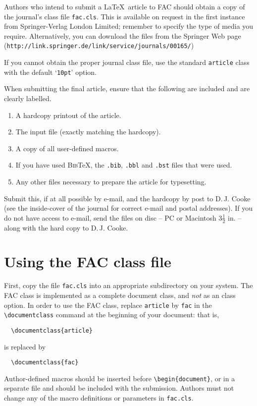 \documentclass{fac}
\begin{document}
Authors who intend to submit a \LaTeX\ article to FAC should obtain a
copy of the journal's class file \verb"fac.cls". This is available on
request in the first instance from Springer-Verlag London Limited; remember to
specify the type of media you require. Alternatively, you can download
the files from the Springer Web page
(\verb"http://link.springer.de/link/service/journals/00165/")

If you cannot obtain the proper journal class file, use the standard
\verb"article" class with the default `\verb"10pt"' option.

When submitting the final article, ensure that  the following are included and
are clearly labelled.
\begin{enumerate}
  \item A hardcopy printout of the article.
  \item The input file (exactly matching the hardcopy).
  \item A copy of all user-defined macros.
  \item If you have used \textsc{Bib}\TeX, the \verb".bib", \verb".bbl"
        and \verb".bst" files that were used.
  \item Any other files necessary to prepare the article for typesetting.
\end{enumerate}
Submit this, if at all possible by e-mail, and the hardcopy by post
to D.\,J. Cooke (see the inside-cover of the journal for correct e-mail
and postal addresses). If you do not have access to e-mail, send the files
on disc -- PC or Macintosh $3\frac{1}{2}$ in. -- along with the hard copy
to D.\,J. Cooke.

\section{Using the FAC class file}

First, copy the file \verb"fac.cls" into an appropriate subdirectory on
your system. The FAC class is implemented as a complete document class,
and \emph{not} as an class option.
In order to use the FAC class, replace \verb"article" by \verb"fac" in the
\verb"\documentclass" command at the beginning of your document: that is,
%
\begin{verbatim}
  \documentclass{article}
\end{verbatim}
%
is replaced by
%
\begin{verbatim}
  \documentclass{fac}
\end{verbatim}
%
Author-defined macros should be inserted before \verb"\begin{document}",
or in a separate file and should be included with the submission.
Authors must not change any of the macro definitions or parameters
in \verb"fac.cls".
\end{document}
